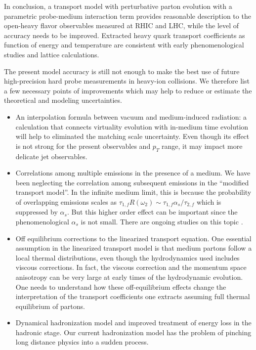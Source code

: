 In conclusion, a transport model with perturbative parton evolution with a parametric probe-medium interaction term provides reasonable description to the open-heavy flavor observables measured at RHIC and LHC, while the level of accuracy needs to be improved.
Extracted heavy quark transport coefficients as function of energy and temperature are consistent with early phenomenological studies and lattice calculations.

The present model accuracy is still not enough to make the best use of future high-precision hard probe measurements in heavy-ion collisions.
We therefore list a few necessary points of improvements which may help to reduce or estimate the theoretical and modeling uncertainties.
\begin{itemize}
\item An interpolation formula between vacuum and medium-induced radiation: a calculation that connects virtuality evolution with in-medium time evolution will help to eliminated the matching scale uncertainty. Even though its effect is not strong for the present observables and $p_T$ range, it may impact more delicate jet observables.
\item Correlations among multiple emissions in the presence of a medium. We have been neglecting the correlation among subsequent emissions in the ``modified transport model''. In the infinite medium limit, this is because the probability of overlapping emissions scales as $\tau_{1,f} R(\omega_2) \sim \tau_{1,f} \alpha_s/\tau_{2,f}$ which is suppressed by $\alpha_s$. But this higher order effect can be important since the phenomenological $\alpha_s$ is not small. There are ongoing studies on this topic \cite{Arnold:2015qya,Arnold:2016kek,Arnold:2016mth,Arnold:2016jnq}.
\item Off equilibrium corrections to the linearized transport equation. One essential assumption in the linearized transport model is that medium partons follow a local thermal distributions, even though the hydrodynamics used includes viscous corrections. 
In fact, the viscous correction and the momentum space anisotropy can be very large at early times of the hydrodynamic evolution. 
One needs to understand how these off-equilibrium effects change the interpretation of the transport coefficients one extracts assuming full thermal equilibrium of partons.
\item Dynamical hadronization model and improved treatment of energy loss in the hadronic stage.
Our current hadronization model has the problem of pinching long distance physics into a sudden process. 

\end{itemize}
